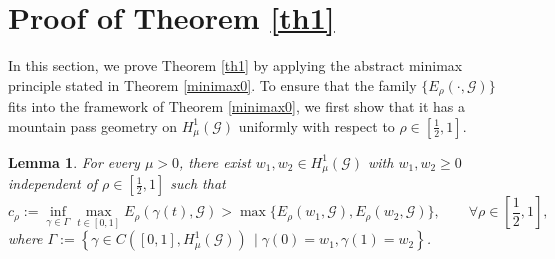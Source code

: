 \documentclass[11pt]{amsart}
\newtheorem{lemma}[theorem]{Lemma}
\newcommand{\G}{\mathcal{G}}
\numberwithin{equation}{section}
\begin{document}
\section{Proof of Theorem \ref{th1}}\label{sect4}
In this section, we prove Theorem \ref{th1} by applying the abstract minimax principle stated in Theorem \ref{minimax0}. To ensure that the family $\{E_{\rho}(\cdot,\G)\}$ fits into the framework of Theorem \ref{minimax0}, we first show that it has a mountain pass geometry on $H^{1}_{\mu}(\G)$ uniformly with respect to $\rho\in [\frac{1}{2},1]$.
\begin{lemma}\label{lem3.1}
For every \(\mu>0\), there exist \(w_{1},w_{2}\in H_{\mu}^{1}(\G)\) with $w_1,w_2\geq 0$ independent of \(\rho\in\left[\frac{1}{2},1\right]\) such that  
\[
c_{\rho}:=\inf_{\gamma\in\Gamma}\max_{t\in[0,1]}E_{\rho}(\gamma(t), \mathcal{G})>\max\{E_{\rho}(w_{1},\mathcal{G}),E_{\rho}(w_{2}, \mathcal{G})\},\qquad\forall\rho\in\left[\frac{1}{2},1\right],
\]
where \(\Gamma:=\left\{\gamma\in C([0,1],H^{1}_{\mu}(\mathcal{G}))\,\mid \gamma(0)=w_{1},\gamma(1)=w_{2}\right\}\).
\end{lemma}
\end{document}
